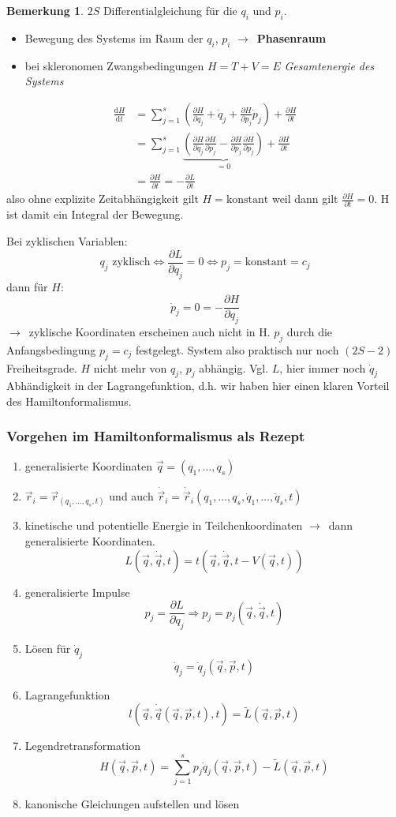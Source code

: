 \documentclass[oneside]{book}
\theoremstyle{definition}
\newtheorem*{bemerkung*}{Bemerkung}
\newcommand{\conseq}{$\rightarrow$~}
\renewcommand{\d}{\mathrm d}
\newcommand{\ddd}[2]{\frac{\d #1}{\d #2}}
\newcommand{\ffpartial}[2]{\frac{\partial #1}{\partial #2}}
\newcommand{\dotvec}[1]{\dot{\vec{#1}}}
\newcommand{\const}{\text{konstant}}
\begin{document}
\begin{bemerkung*}
	$2S$ Differentialgleichung für die $q_i$ und $p_i$.
	\begin{itemize}
		\item Bewegung des Systems im Raum der $q_i$, $p_i$ \conseq \textbf{Phasenraum}
		\item bei skleronomen Zwangsbedingungen $H = T + V = E$ \textit{Gesamtenergie des Systems}
	\end{itemize}
\end{bemerkung*}
\begin{align*}
	\ddd{H}{t} &= \sum_{j=1}^{s} (\ffpartial{H}{q_j} + \dot{q}_j + \ffpartial{H}{p_j} \dot{p}_j) + \ffpartial{H}{t}\\
	&= \sum_{j=1}^{s} \underbrace{(\ffpartial{H}{q_j} \ffpartial{H}{p_j} - \ffpartial{H}{p_j} \ffpartial{H}{p_j})}_{=0}+ \ffpartial{H}{t}\\
	&= \ffpartial{H}{t} = - \ffpartial{L}{t}
\end{align*} 
also ohne explizite Zeitabhängigkeit gilt $H = \const$ weil dann gilt $\ffpartial{H}{t} = 0$. H ist damit ein Integral der Bewegung.

Bei zyklischen Variablen:
$$q_j \text{~zyklisch} \Leftrightarrow \ffpartial{L}{q_j} = 0 \Leftrightarrow p_j = \const = c_j$$
dann für $H$:
$$\dot{p}_j = 0 = -\ffpartial{H}{q_j}$$
\conseq zyklische Koordinaten erscheinen auch nicht in H.
$p_j$ durch die Anfangsbedingung $p_j = c_j$ festgelegt. System also praktisch nur noch $(2S -2)$ Freiheitsgrade.
$H$ nicht mehr von $q_j$, $p_j$ abhängig. Vgl. $L$, hier immer noch $\dot{q}_j$ Abhändigkeit in der Lagrangefunktion, d.h. wir haben hier einen klaren Vorteil des Hamiltonformalismus.

\subsubsection{Vorgehen im Hamiltonformalismus als Rezept}
\begin{enumerate}
	\item generalisierte Koordinaten $\vec{q} = (q_1, \dots, q_s)$
	\item $\vec{r}_i = \vec{r}_(q_1, \dots, q_s, t)$ und auch $\dotvec{r}_i = \dotvec{r}_i(q_1, \dots, q_s, \dot{q}_1, \dots, \dot{q}_s, t)$
	\item kinetische und potentielle Energie in Teilchenkoordinaten \conseq dann generalisierte Koordinaten.
	$$L(\vec{q}, \dotvec{q}, t) = t(\vec{q}, \dotvec q,t  - V(\vec{q}, t))$$
	\item generalisierte Impulse
		$$p_j = \ffpartial{L}{\dot{q}_j} \Rightarrow p_j = p_j(\vec{q}, \dotvec{q}, t)$$
	\item Lösen für $\dot{q}_j$
	$$\dot{q}_j = \dot{q}_j (\vec{q}, \vec{p}, t)$$
	\item Lagrangefunktion
	$$l(\vec{q}, \dotvec{q}(\vec{q}, \vec{p}, t), t) = \tilde{L}(\vec{q}, \vec{p}, t)$$
	\item Legendretransformation
	$$H(\vec{q}, \vec{p}, t) = \sum_{j=1}^s p_j \dot{q}_j(\vec{q}, \vec{p}, t) - \tilde{L}(\vec{q}, \vec{p}, t)$$
	\item kanonische Gleichungen aufstellen und lösen
\end{enumerate}
\end{document}
